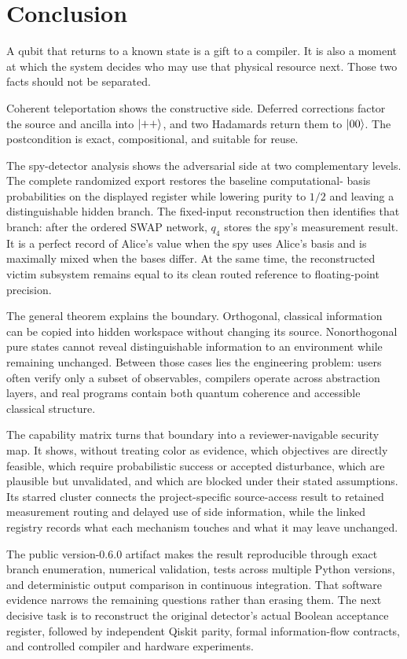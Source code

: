 \section{Conclusion}
\label{sec:conclusion}

A qubit that returns to a known state is a gift to a compiler. It is also a
moment at which the system decides who may use that physical resource next.
Those two facts should not be separated.

Coherent teleportation shows the constructive side. Deferred corrections factor
the source and ancilla into $\ket{++}$, and two Hadamards return them to
$\ket{00}$. The postcondition is exact, compositional, and suitable for reuse.

The spy-detector analysis shows the adversarial side at two complementary
levels. The complete randomized export restores the baseline computational-
basis probabilities on the displayed register while lowering purity to $1/2$
and leaving a distinguishable hidden branch. The fixed-input reconstruction then
identifies that branch: after the ordered SWAP network, $q_4$ stores the spy's
measurement result. It is a perfect record of Alice's value when the spy uses
Alice's basis and is maximally mixed when the bases differ. At the same time,
the reconstructed victim subsystem remains equal to its clean routed reference
to floating-point precision.

The general theorem explains the boundary. Orthogonal, classical information
can be copied into hidden workspace without changing its source. Nonorthogonal
pure states cannot reveal distinguishable information to an environment while
remaining unchanged. Between those cases lies the engineering problem: users
often verify only a subset of observables, compilers operate across abstraction
layers, and real programs contain both quantum coherence and accessible
classical structure.


The capability matrix turns that boundary into a reviewer-navigable security
map. It shows, without treating color as evidence, which objectives are directly
feasible, which require probabilistic success or accepted disturbance, which
are plausible but unvalidated, and which are blocked under their stated
assumptions. Its starred cluster connects the project-specific source-access
result to retained measurement routing and delayed use of side information,
while the linked registry records what each mechanism touches and what it may
leave unchanged.

The public version-0.6.0 artifact makes the result reproducible through exact
branch enumeration, numerical validation, tests across multiple Python
versions, and deterministic output comparison in continuous integration. That
software evidence narrows the remaining questions rather than erasing them. The
next decisive task is to reconstruct the original detector's actual Boolean
acceptance register, followed by independent Qiskit parity, formal
information-flow contracts, and controlled compiler and hardware experiments.

